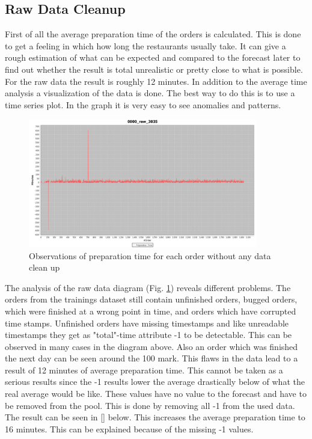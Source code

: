 \subsection{Raw Data Cleanup}\label{subsection:Raw Data Cleanup}
First of all the average preparation time of the orders is calculated. This is done to get a feeling in which how long the restaurants usually take. It can give a rough estimation of what can be expected and compared to the forecast later to find out whether the result is total unrealistic or pretty close to what is possible. For the raw data the result is roughly 12 minutes.\newline
In addition to the average time analysis a visualization of the data is done. The best way to do this is to use a time series plot. In the graph it is very easy to see anomalies and patterns.

\begin{figure}[h]
\begin{center}
\includegraphics[width=10cm]{images/0000_raw_3035.png}
\caption{Observations of preparation time for each order without any data clean up}
\label{fig:0000_raw_3035.png}
\end{center}
\end{figure}

The analysis of the raw data diagram (Fig. \ref{fig:0000_raw_3035.png}) reveals different problems. The orders from the trainings dataset still contain unfinished orders, bugged orders, which were finished at a wrong point in time, and orders which have corrupted time stamps. Unfinished orders have missing timestamps and like unreadable timestamps they get as "total"-time attribute -1 to be detectable. This can be observed in many cases in the diagram above. Also an order which was finished the next day can be seen around the 100 mark. This flaws in the data lead to a result of 12 minutes of average preparation time. This cannot be taken as a serious results since the -1 results lower the average drastically below of what the real average would be like. These values have no value to the forecast and have to be removed from the pool. This is done by removing all -1 from the used data. The result can be seen in [] below. This increases the average preparation time to 16 minutes. This can be explained because of the missing -1 values.

